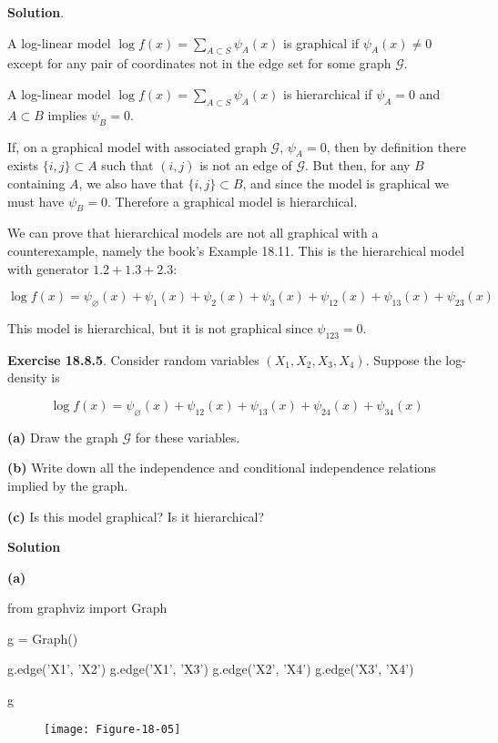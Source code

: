 \textbf{Solution}.

A log-linear model \(\log f(x) = \sum_{A \subset S} \psi_A(x)\) is
graphical if \(\psi_A(x) \neq 0\) except for any pair of coordinates not
in the edge set for some graph \(\mathcal{G}\).

A log-linear model \(\log f(x) = \sum_{A \subset S} \psi_A(x)\) is
hierarchical if \(\psi_A = 0\) and \(A \subset B\) implies
\(\psi_B = 0\).

If, on a graphical model with associated graph \(\mathcal{G}\),
\(\psi_A = 0\), then by definition there exists \(\{ i, j \} \subset A\)
such that \((i, j)\) is not an edge of \(\mathcal{G}\). But then, for
any \(B\) containing \(A\), we also have that \(\{ i, j \} \subset B\),
and since the model is graphical we must have \(\psi_B = 0\). Therefore
a graphical model is hierarchical.

We can prove that hierarchical models are not all graphical with a
counterexample, namely the book's Example 18.11. This is the
hierarchical model with generator \(1.2 + 1.3 + 2.3\):

\[\log f(x) = \psi_\varnothing(x) + \psi_{1}(x) + \psi_{2}(x) + \psi_{3}(x) + \psi_{12}(x) + \psi_{13}(x) + \psi_{23}(x)\]

This model is hierarchical, but it is not graphical since
\(\psi_{123} = 0\).

\textbf{Exercise 18.8.5}. Consider random variables
\((X_{1}, X_{2}, X_{3}, X_{4})\). Suppose the log-density is

\[\log f(x) = \psi_\varnothing(x) + \psi_{12}(x) + \psi_{13}(x) + \psi_{24}(x) + \psi_{34}(x) \]

\textbf{(a)} Draw the graph \(\mathcal{G}\) for these variables.

\textbf{(b)} Write down all the independence and conditional
independence relations implied by the graph.

\textbf{(c)} Is this model graphical? Is it hierarchical?

\textbf{Solution}

\textbf{(a)}

\begin{python}
from graphviz import Graph

g = Graph()

g.edge('X1', 'X2')
g.edge('X1', 'X3')
g.edge('X2', 'X4')
g.edge('X3', 'X4')

g
\end{python}

\begin{figure}[H]
\centering
\texttt{[image: Figure-18-05]}
\end{figure}

